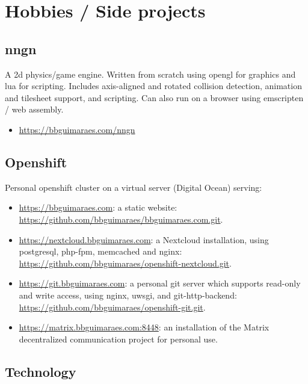 \section*{Hobbies / Side projects}
\subsection*{nngn}

A 2d physics/game engine.  Written from scratch using opengl for graphics and
lua for scripting.  Includes axis-aligned and rotated collision detection,
animation and tilesheet support, and scripting.  Can also run on a browser
using emscripten / web assembly.

\begin{itemize}[noitemsep]
    \item \url{https://bbguimaraes.com/nngn}
\end{itemize}

\subsection*{Openshift}

Personal openshift cluster on a virtual server (Digital Ocean) serving:

\begin{itemize}[noitemsep]
    \item
        \url{https://bbguimaraes.com}: a static website:
        \url{https://github.com/bbguimaraes/bbguimaraes.com.git}.
    \item
        \url{https://nextcloud.bbguimaraes.com}: a Nextcloud installation,
        using postgresql, php-fpm, memcached and nginx:
        \url{https://github.com/bbguimaraes/openshift-nextcloud.git}.
    \item
        \url{https://git.bbguimaraes.com}: a personal git server which supports
        read-only and write access, using nginx, uwsgi, and git-http-backend:
        \url{https://github.com/bbguimaraes/openshift-git.git}.
    \item
        \url{https://matrix.bbguimaraes.com:8448}: an installation of the
        Matrix decentralized communication project for personal use.
\end{itemize}

\subsection*{Technology}

